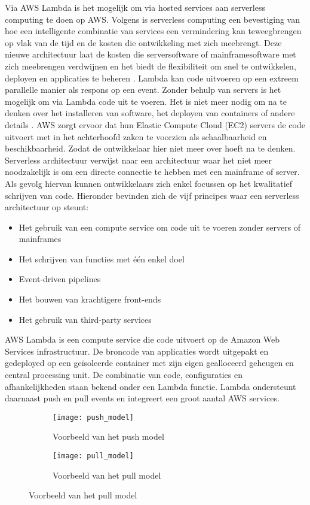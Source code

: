 Via AWS Lambda is het mogelijk om via hosted services aan serverless computing te doen op AWS. Volgens \textcite{Sbarski2017} is serverless computing een bevestiging van hoe een intelligente combinatie van services een vermindering kan teweegbrengen op vlak van de tijd en de kosten die ontwikkeling met zich meebrengt. Deze nieuwe architectuur laat de kosten die serversoftware of mainframesoftware met zich meebrengen verdwijnen en het biedt de flexibiliteit om snel te ontwikkelen, deployen en applicaties te beheren \autocite{Sbarski2017}. Lambda kan code uitvoeren op een extreem parallelle manier als respons op een event. Zonder behulp van servers is het mogelijk om via Lambda code uit te voeren. Het is niet meer nodig om na te denken over het installeren van software, het deployen van containers of andere details \autocite{Sbarski2017}. AWS zorgt ervoor dat hun Elastic Compute Cloud (EC2) servers de code uitvoert met in het achterhoofd zaken te voorzien als schaalbaarheid en beschikbaarheid. Zodat de ontwikkelaar hier niet meer over hoeft na te denken. Serverless architectuur verwijst naar een architectuur waar het niet meer noodzakelijk is om een directe connectie te hebben met een mainframe of server. Als gevolg hiervan kunnen ontwikkelaars zich enkel focussen op het kwalitatief schrijven van code. Hieronder bevinden zich de vijf principes waar een serverless architectuur op steunt:
 \begin{itemize}
    \item Het gebruik van een compute service om code uit te voeren zonder servers of mainframes
    \item Het schrijven van functies met één enkel doel
    \item Event-driven pipelines
    \item Het bouwen van krachtigere front-ends
    \item Het gebruik van third-party services
\end{itemize}

AWS Lambda is een compute service die code uitvoert op de Amazon Web Services infrastructuur. De broncode van applicaties wordt uitgepakt en gedeployed op een geïsoleerde container met zijn eigen gealloceerd geheugen en central processing unit. De combinatie van code, configuraties en afhankelijkheden staan bekend onder een Lambda functie. Lambda ondersteunt daarnaast push en pull events en integreert een groot aantal AWS services. 
\begin{figure}[h]
    \centering
    \begin{subfigure}{0.45\textwidth}
        \texttt{[image: push\_model]}
        \caption{Voorbeeld van het push model \autocite{Sbarski2017}}
    \end{subfigure}
    \hfill
    \begin{subfigure}{0.45\textwidth}
        \texttt{[image: pull\_model]}
        \caption{Voorbeeld van het pull model \autocite{Sbarski2017}}
    \end{subfigure}
\end{figure}

